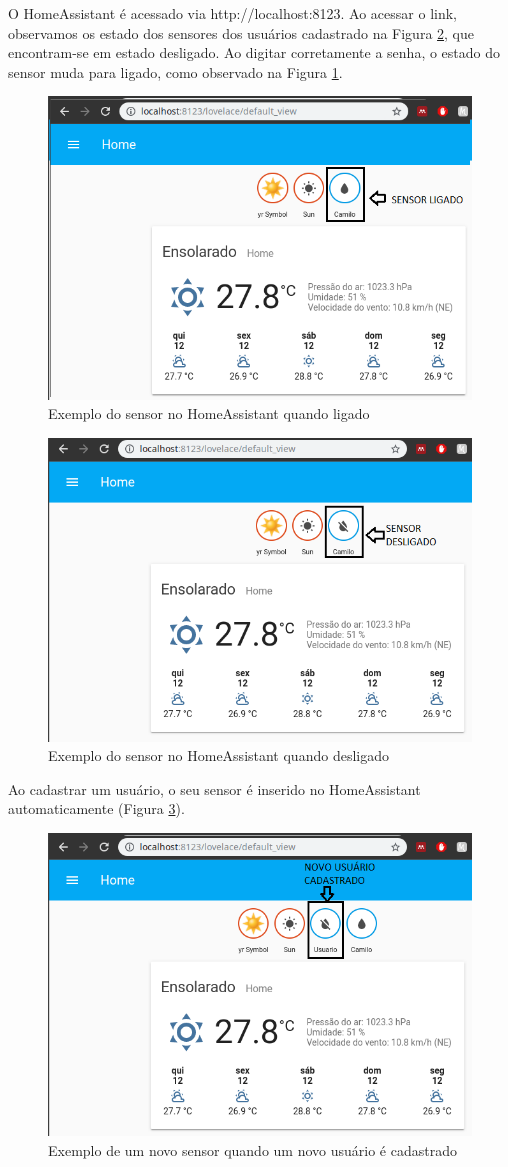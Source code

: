 O HomeAssistant é acessado via http://localhost:8123. Ao acessar o link, observamos os estado dos sensores dos usuários cadastrado na Figura \ref{fig:homeassistant-off}, que encontram-se em estado desligado. Ao digitar corretamente a senha, o estado do sensor muda para ligado, como observado na Figura \ref{fig:homeassistant-on}.

\begin{figure}[htbp]
	\centering
	\includegraphics[width=0.6\linewidth]{figuras/homeassistanton.png}
	\caption{Exemplo do sensor no HomeAssistant quando ligado}
	\label{fig:homeassistant-on}
\end{figure}

\begin{figure}[htbp]
	\centering
	\includegraphics[width=0.6\linewidth]{figuras/homeassistantoff.png}
	\caption{Exemplo do sensor no HomeAssistant quando desligado}
	\label{fig:homeassistant-off}
\end{figure}

Ao cadastrar um usuário, o seu sensor é inserido no HomeAssistant automaticamente (Figura \ref{fig:homeassistant-new}).

\begin{figure}[htbp]
	\centering
	\includegraphics[width=1\linewidth]{figuras/homeassistantnewuser.png}
	\caption{Exemplo de um novo sensor quando um novo usuário é cadastrado}
	\label{fig:homeassistant-new}
\end{figure}


